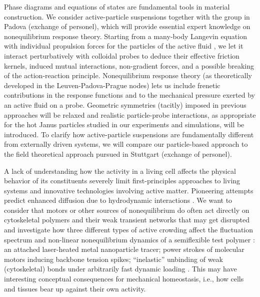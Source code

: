 \begin{workpackage}[id=WPactive,wphases=0-48,
  short=Active Particle Suspensions,%
  title=Probing active particle suspensions with colloids and polymers,
  lead=ULEI,
  ULEIRM=96,UNIPDRM=6,USTUTTRM=2]
\begin{tasklist}
\begin{task}[title=Nonequilibrium equations of state (NEOS),id=task1,PM=8,lead=ULEI,partners={UNIPD,USTUTT},
wphases=0-48!0.5]
Phase diagrams and equations of states are fundamental tools in material construction.
We consider active-particle suspensions together with the group in Padova (exchange of personel), 
which will provide essential expert knowledge on nonequilibrium response theory.
%
Starting from a many-body Langevin equation with individual propulsion forces for the
particles of the active fluid \cite{solon-etal:2015}, we let it interact perturbatively with colloidal probes to
deduce their effective friction kernels, induced mutual interactions, non-gradient forces, and a possible breaking of
the action-reaction principle.  
%
Nonequilibrium response theory (as theoretically developed in the Leuven-Padova-Prague nodes) lets us include 
frenetic contributions in the response functions \cite{baiesi-wynants:2009} and to the mechanical pressure 
exerted by an active fluid on a probe. 
%
Geometric symmetries (tacitly) imposed in previous approaches will be relaxed and realistic particle-probe interactions, 
as appropriate for the hot Janus particles studied in our experiments and simulations, will be introduced.
%
To clarify how active-particle suspensions are fundamentally different from externally driven systems,
we will compare our particle-based approach to the field theoretical approach pursued in Stuttgart (exchange of personel). 

\end{task}

\begin{task}[title=Active Crowding,id=task2,lead=ULEI,partners={KUL},wphases=0-48!0.5]
A lack of understanding how the activity in a living cell affects the physical behavior
of its constituents severely limit first-principles approaches to living systems and 
innovative technologies involving active matter.
Pioneering attempts predict enhanced diffusion due to hydrodynamic interactions \cite{mikhailov-kapral:2015}.
%
We want to consider that motors or other sources of nonequilibrium do often act directly on cytoskeletal 
polymers and their weak transient networks that may get disrupted and investigate how three different types of active
crowding affect the fluctuation spectrum and non-linear nonequilibrium dynamics of a 
semiflexible test polymer \cite{otto-etal:2013}:
an attached laser-heated metal nanoparticle tracer; power strokes of molecular
motors inducing backbone tension spikes; ``inelastic''  \cite{gralka-kroy:2015}
unbinding of weak (cytoskeletal) bonds under arbitrarily fast dynamic loading \cite{bullerjahn-sturm-kroy:2014}.
%
This may have interesting conceptual consequences for mechanical homeostasis, i.e., how cells and tissues bear up against 
their own activity.   


\end{task}
\end{tasklist}
\end{workpackage}
